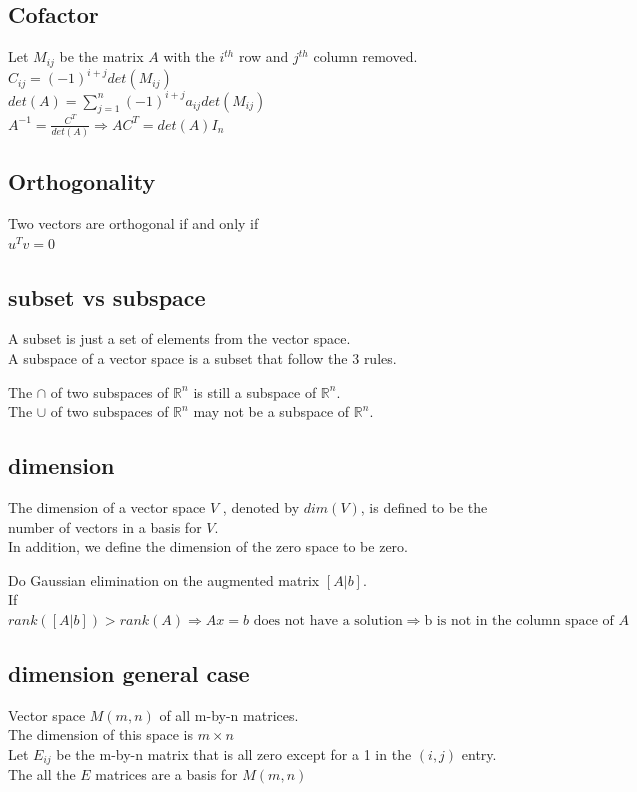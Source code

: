 \begin{multicols}{3}
\subsection{Cofactor}
Let $M_{ij}$ be the matrix $A$ with the $i^{th}$ row and $j^{th}$ column removed.\\
$C_{ij} = (-1)^{i+j}det(M_{ij})$\\
$det(A) = \sum_{j=1}^{n}(-1)^{i+j}a_{ij}det(M_{ij})$\\
$A^{-1} = \frac{C^{T}}{det(A)} \Rightarrow AC^{T} = det(A)I_{n}$

\subsection{Orthogonality}
Two vectors are orthogonal if and only if\\
$u^{T}v = 0$

\subsection{subset vs subspace}
A subset is just a set of elements from the vector space.\\
A subspace of a vector space is a subset that follow the 3 rules.

The $\cap$ of two subspaces of $\mathbb{R}^{n}$ is still a subspace of $\mathbb{R}^{n}$.\\
The $\cup$ of two subspaces of $\mathbb{R}^{n}$ may not be a subspace of $\mathbb{R}^{n}$.

\subsection{dimension}
The dimension of a vector space $V$ , denoted by $dim(V)$, is defined to be the number of vectors in a basis for $V$.\\
In addition, we define the dimension of the zero space to be zero.

Do Gaussian elimination on the augmented matrix $[A|b]$.\\
If $rank([A|b]) > rank(A) \Rightarrow Ax = b \text{ does not have a solution} \Rightarrow \text{b is not in the column space of } A$

\subsection{dimension general case}
Vector space $M(m, n)$ of all m-by-n matrices.\\
The dimension of this space is $m \times n$\\
Let $E_{ij}$ be the m-by-n matrix that is all zero except for a 1 in the $(i, j)$ entry.\\
The all the $E$ matrices are a basis for $M(m, n)$


\end{multicols}
